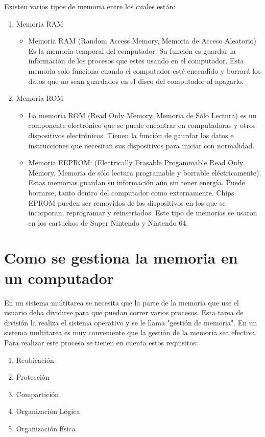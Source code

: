 \documentclass{article}
\begin{document}
Existen varios tipos de memoria entre los cuales están:

\begin{enumerate}
    \item Memoria RAM
    
    \begin{itemize}
        \item Memoria RAM (Random Access Memory, Memoria de Acceso Aleatorio) Es la memoria temporal del computador. Su función es guardar la información de los procesos que estes usando en el computador. Esta memoria solo funciona cuando el computador esté encendido y borrará los datos que no sean guardados en el disco del computador al apagarlo.
    \end{itemize}
    \item Memoria ROM
    \begin{itemize}
        \item La memoria ROM (Read Only Memory, Memoria de Sólo Lectura) es un componente electrónico que se puede encontrar en computadoras y otros dispositivos electrónicos. Tienen la función de gaurdar los datos e instrucciones que necesitan sus dispositivos para iniciar con normalidad.
        
        \item Memoria EEPROM: (Electrically Erasable Progammable Read Only Memory, Memoria de sólo lectura programable y borrable eléctricamente). Estas memorias guardan su información aún sin tener energía. Puede borrarse, tanto dentro del computador como externamente. Chips EPROM pueden ser removidos de los dispositivos en los que se incorporan, reprogramar y reinsertados.\cite{eeprom} Este tipo de memorias se usaron en los cartuchos de Super Nintendo y Nintendo 64.
    \end{itemize}
\end{enumerate}

\section{Como se gestiona la memoria en un computador}En un sistema multitarea se necesita que la parte de la memoria que use el usuario deba dividirse para que puedan correr varios procesos. Esta tarea de división la realiza el sistema operativo y se le llama "gestión de memoria".
En un sistema multitarea es muy conveniente que la gestión de la memoria sea efectiva. Para realizar este proceso se tienen en cuenta estos requisitos: 
\begin{enumerate}
    \item Reubicación
    \item Protección
    \item Compartición
    \item Organización Lógica
    \item Organización física
\end{enumerate}
\end{document}
